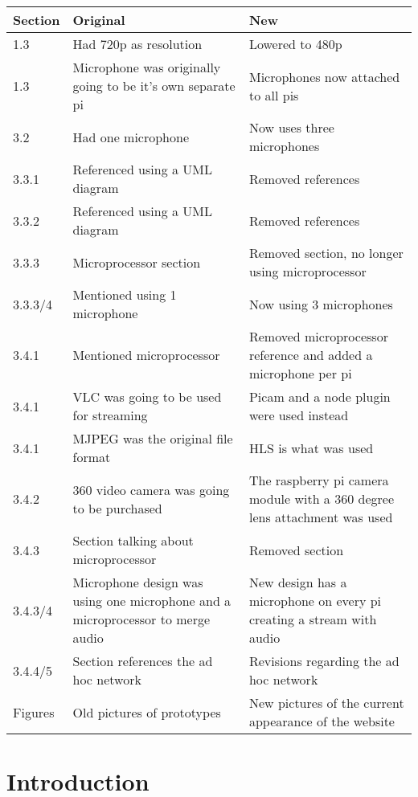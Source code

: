 \documentclass[onecolumn, draftclsnofoot,10pt, compsoc]{IEEEtran}
\begin{document}
\begin{center}
 \begin{tabular}{||p{1cm} p{7cm} p{7cm}||} 
 \hline
 Section & Original & New\\ [.5ex] 
 \hline\hline
 1.3 & Had 720p as resolution & Lowered to 480p\\
 \hline
  1.3 & Microphone was originally going to be it's own separate pi & Microphones now attached to all pis\\
   \hline
  3.2 & Had one microphone & Now uses three microphones\\
  \hline
  3.3.1 & Referenced using a UML diagram & Removed references\\ 
  \hline
  3.3.2 & Referenced using a UML diagram & Removed references\\ 
  \hline
  3.3.3 & Microprocessor section & Removed section, no longer using microprocessor  \\
  \hline
  3.3.3/4 & Mentioned using 1 microphone & Now using 3 microphones \\
    \hline
 3.4.1 & Mentioned microprocessor & Removed microprocessor reference and added a microphone per pi \\
  \hline
 3.4.1 & VLC was going to be used for streaming & Picam and a node plugin were used instead \\ 
 \hline
 3.4.1 & MJPEG was the original file format & HLS is what was used\\ 
 \hline
 3.4.2 & 360 video camera was going to be purchased & The raspberry pi camera module with a 360 degree lens attachment was used\\
 \hline
 3.4.3 & Section talking about microprocessor & Removed section \\ 
 \hline
 3.4.3/4 & Microphone design was using one microphone and a microprocessor to merge audio & New design has a microphone on every pi creating a stream with audio \\ 
 \hline
 3.4.4/5 & Section references the ad hoc network & Revisions regarding the ad hoc network\\
 \hline
 Figures & Old pictures of prototypes & New pictures of the current appearance of the website\\[1ex] 
 \hline
\end{tabular}
\end{center}

\section{Introduction}
\end{document}
